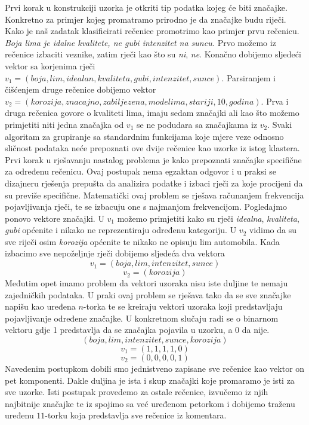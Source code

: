 \documentclass[a4paper,twoside,12pt]{memoir} %
\begin{document}
Prvi korak u konstrukciji uzorka je otkriti tip podatka kojeg će biti značajke. Konkretno za primjer kojeg promatramo prirodno je da značajke budu riječi. Kako je naš zadatak klasificirati rečenice promotrimo kao primjer prvu rečenicu.\\
\textit{Boja lima je idalne kvalitete, ne gubi intenzitet na suncu.} Prvo možemo iz rečenice izbaciti veznike, zatim rječi kao što su \textit{ni}, \textit{ne}. Konačno dobijemo sljedeći vektor sa korjenima rječi $v_1=(boja,lim,idealan,kvaliteta,gubi,intenzitet,sunce)$. Parsiranjem i čišćenjem druge rečenice dobijemo vektor $v_2=(korozija,znacajno,zabiljezena,modelima,stariji,10,godina)$. Prva i druga rečenica govore o kvaliteti lima, imaju sedam značajki ali kao što možemo primjetiti niti jedna značajka od $v_1$ se ne podudara sa značajkama iz $v_2$. Svaki algoritam za grupiranje sa standardnim funkcijama koje mjere veze odnosno sličnost podataka neće prepoznati ove dvije rečenice kao uzorke iz istog klastera. Prvi korak u rješavanju nastalog problema je kako prepoznati značajke specifične za određenu rečenicu. Ovaj postupak nema egzaktan odgovor i u praksi se dizajneru rješenja prepušta da analizira podatke i izbaci rječi za koje procijeni da su previše specifične. Matematički ovaj problem se rješava računanjem frekvencija pojavljivanja rječi, te se izbacuju one s najmanjom frekvencijom. Pogledajmo ponovo vektore značajki. U $v_1$ možemo primjetiti kako su rječi \textit{idealna}, \textit{kvaliteta}, \textit{gubi} općenite i nikako ne reprezentiraju određenu kategoriju. U $v_2$ vidimo da su sve riječi osim \textit{korozija} općenite te nikako ne opisuju lim automobila. Kada izbacimo sve nepoželjnje rječi dobijemo sljedeća dva vektora
\[
v_1 =(boja, lim, intenzitet, sunce)
\]
\[
v_2 = (korozija)
\]
Međutim opet imamo problem da vektori uzoraka nisu iste duljine te nemaju zajedničkih podataka. U praki ovaj problem se rješava tako da se sve značajke napišu kao uređena $n$-torka te se kreiraju vektori uzoraka koji predstavljaju pojavljivanje određene značajke. U konkretnom slučaju radi se o binarnom vektoru gdje 1 predstavlja da se značajka pojavila u uzorku, a 0 da nije.
\[
(boja,lim,intenzitet,sunce, korozija)
\]
\[v_1=(1,1,1,1,0)\]
\[v_2=(0,0,0,0,1)\]
Navedenim postupkom dobili smo jednistveno zapisane sve rečenice kao vektor on pet komponenti. Dakle duljina je ista i skup značajki koje promaramo je isti za sve uzorke. Isti postupak provedemo za ostale rečenice, izvučemo iz njih najbitnije značajke te iz spojimo sa već uređenom petorkom i dobijemo traženu uređenu $11$-torku koja predstavlja sve rečenice iz komentara.
\end{document}
